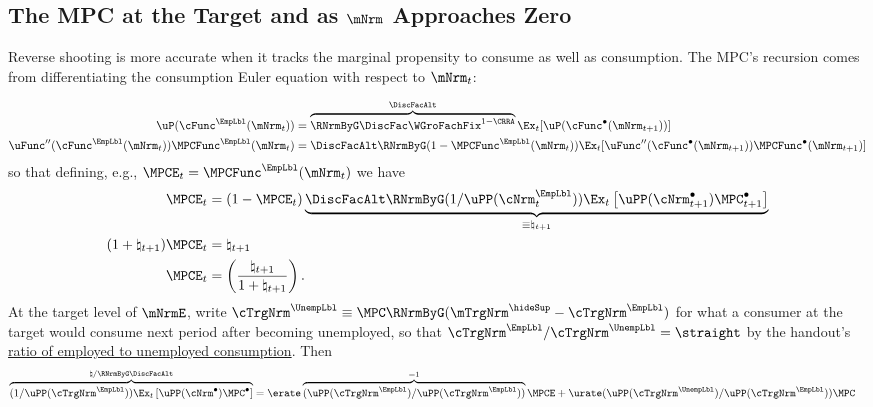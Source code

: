 \documentclass{econark}
\begin{document}
\subsection{The MPC at the Target and as $\mNrm$ Approaches Zero}\label{sec:TractableBufferStock-MPC}

Reverse shooting is more accurate when it tracks the marginal propensity to consume as well as consumption.  The MPC's recursion comes from differentiating the consumption Euler equation with respect to $\mNrm_{t}$:

\begin{equation}\begin{gathered}\begin{aligned}
  \uP(\cFunc^{\EmpLbl}(\mNrm_{t})) & = \overbrace{\RNrmByG \DiscFac \WGroFachFix^{1-\CRRA}}^{\DiscFacAlt} \Ex_{t}[\uP(\cFunc^{\bullet}(\mNrm_{t+1}))]
\\  \uFunc^{\prime\prime}(\cFunc^{\EmpLbl}(\mNrm_{t}))\MPCFunc^{\EmpLbl}(\mNrm_{t}) & = \DiscFacAlt  \RNrmByG (1-\MPCFunc^{\EmpLbl}(\mNrm_{t}))\Ex_{t}[\uFunc^{\prime\prime}(\cFunc^{\bullet}(\mNrm_{t+1}))\MPCFunc^{\bullet}(\mNrm_{t+1})] \label{eq:dEuler}
\end{aligned}\end{gathered}\end{equation}
so that defining, e.g., $\MPCE_{t} = \MPCFunc^{\EmpLbl}(\mNrm_{t})$ we have 
\begin{equation}\begin{gathered}\begin{aligned}
 \MPCE_{t} & =  (1-\MPCE_{t}) \underbrace{\DiscFacAlt \RNrmByG (1/\uPP({\cNrm}^{\EmpLbl}_{t}))\Ex_{t}\left[\uPP(\cNrm^{\bullet}_{t+1})\MPC^{\bullet}_{t+1}\right]}_{\equiv \natural_{t+1}}
\\ (1+\natural_{t+1})\MPCE_{t} & = \natural_{t+1} \label{eq:naturalMPC}
\\ \MPCE_{t} & = \left(\frac{\natural_{t+1}}{1+\natural_{t+1}}\right)
.
\end{aligned}\end{gathered}\end{equation}
At the target level of $\mNrmE$, write $\cTrgNrm^{\UnempLbl} \equiv \MPC\RNrmByG(\mTrgNrm^{\hideSup}-\cTrgNrm^{\EmpLbl})$ for what a consumer at the target would consume next period after becoming unemployed, so that $\cTrgNrm^{\EmpLbl}/\cTrgNrm^{\UnempLbl} = \straight$ by the handout's \hyperref[eq:cRatEtfmcRatUtp1]{ratio of employed to unemployed consumption}.  Then
\begin{equation}\begin{gathered}\begin{aligned}
  \overbrace{(1/\uPP(\cTrgNrm^{\EmpLbl}))\Ex_{t}\left[\uPP(\cNrm^{\bullet})\MPC^{\bullet}\right]}^{\natural / \RNrmByG \DiscFacAlt} & =  \erate \overbrace{(\uPP(\cTrgNrm^{\EmpLbl})/\uPP(\cTrgNrm^{\EmpLbl}))}^{=1}\MPCE+\urate (\uPP(\cTrgNrm^{\UnempLbl})/\uPP(\cTrgNrm^{\EmpLbl}))\MPC
\end{aligned}\end{gathered}\end{equation}
\end{document}
